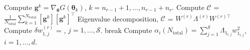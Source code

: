 \begin{breakablealgorithm}
\begin{algorithmic}[1]
		\State Compute $\bm{g}^k = \nabla_{\bm{\theta}}G(\bm\theta_k)$, 
             	$k=n_{r-1}+1, \ldots, n_{r-1}+n_r$.  
		\State Compute $\mathcal{C}$ = 
        	$\frac{1}{N_\text{total}}\sum\limits_{k=1}^{N_\text{total}}[\bm{g}^k][\bm{g}^k]^\top$
		\State Eigenvalue decomposition, $\mathcal{C}$ = $W^{(r)}\Lambda^{(r)} W^{(r)\top}$
		\State Compute $\delta w_{1,j}^{(r)}$ = 
                       , 
                       $j = 1,\ldots,\mathcal{S}$.
			\State break
		\EndIf
	\EndLoop
	\State Compute $\alpha_i(N_\text{total}) = \sum\limits_{j=1}^{\mathcal{S}} \Lambda_{1_{i,j}}w_{1_{i,j}}^2$,
	$i=1,\ldots,d$.
	
    \EndProcedure
  \end{algorithmic}
  \label{alg:grad}
\end{breakablealgorithm}
\bigskip

